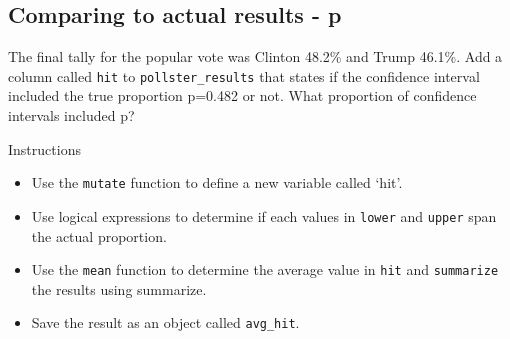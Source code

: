 \documentclass[]{article}
\newenvironment{Shaded}{\begin{snugshade}}{\end{snugshade}}
\newcommand{\KeywordTok}[1]{\textcolor[rgb]{0.13,0.29,0.53}{\textbf{#1}}}
\newcommand{\DataTypeTok}[1]{\textcolor[rgb]{0.13,0.29,0.53}{#1}}
\newcommand{\DecValTok}[1]{\textcolor[rgb]{0.00,0.00,0.81}{#1}}
\newcommand{\FloatTok}[1]{\textcolor[rgb]{0.00,0.00,0.81}{#1}}
\newcommand{\StringTok}[1]{\textcolor[rgb]{0.31,0.60,0.02}{#1}}
\newcommand{\CommentTok}[1]{\textcolor[rgb]{0.56,0.35,0.01}{\textit{#1}}}
\newcommand{\OperatorTok}[1]{\textcolor[rgb]{0.81,0.36,0.00}{\textbf{#1}}}
\newcommand{\NormalTok}[1]{#1}
\providecommand{\tightlist}{%
  \setlength{\itemsep}{0pt}\setlength{\parskip}{0pt}}
\begin{document}
\begin{Shaded}
\end{Shaded}

\subsection{\texorpdfstring{\textbf{Comparing to actual results -
p}}{Comparing to actual results - p}}\label{comparing-to-actual-results---p}

The final tally for the popular vote was Clinton 48.2\% and Trump
46.1\%. Add a column called \texttt{hit} to \texttt{pollster\_results}
that states if the confidence interval included the true proportion
p=0.482 or not. What proportion of confidence intervals included p?

Instructions

\begin{itemize}
\tightlist
\item
  Use the \texttt{mutate} function to define a new variable called
  `hit'.
\item
  Use logical expressions to determine if each values in \texttt{lower}
  and \texttt{upper} span the actual proportion.
\item
  Use the \texttt{mean} function to determine the average value in
  \texttt{hit} and \texttt{summarize} the results using summarize.
\item
  Save the result as an object called \texttt{avg\_hit}.
\end{itemize}
\end{document}
